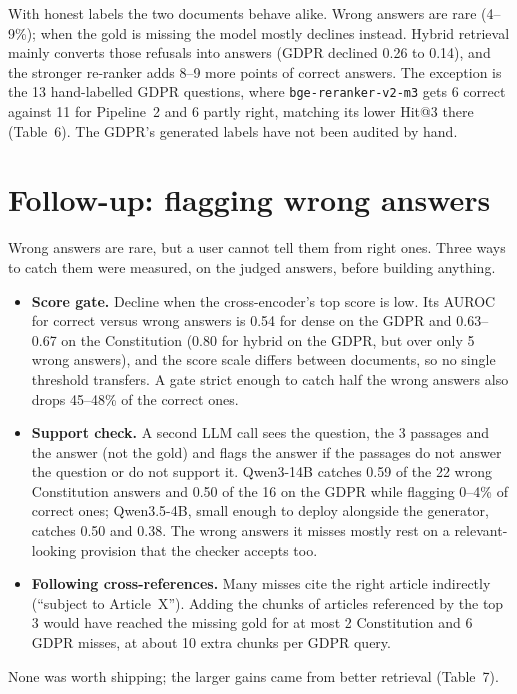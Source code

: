 \documentclass[10pt,a4paper]{article}
\begin{document}
With honest labels the two documents behave alike. Wrong answers are rare (4--9\%); when the gold is missing the
model mostly declines instead. Hybrid retrieval mainly converts those refusals into answers (GDPR declined 0.26 to
0.14), and the stronger re-ranker adds 8--9 more points of correct answers. The exception is the 13 hand-labelled
GDPR questions, where \texttt{bge-reranker-v2-m3} gets 6 correct against 11 for Pipeline~2 and 6 partly right,
matching its lower Hit@3 there (Table~6). The GDPR's generated labels have not been audited by hand.

\section{Follow-up: flagging wrong answers}

Wrong answers are rare, but a user cannot tell them from right ones. Three ways to catch them were measured, on the
judged answers, before building anything.
\begin{itemize}
  \item \textbf{Score gate.} Decline when the cross-encoder's top score is low. Its AUROC for correct versus wrong
    answers is 0.54 for dense on the GDPR and 0.63--0.67 on the Constitution (0.80 for hybrid on the GDPR, but
    over only 5 wrong answers), and the score scale differs between documents, so no single threshold transfers.
    A gate strict enough to catch half the wrong answers also drops 45--48\% of the correct ones.
  \item \textbf{Support check.} A second LLM call sees the question, the 3 passages and the answer (not the gold) and
    flags the answer if the passages do not answer the question or do not support it. Qwen3-14B catches 0.59 of the
    22 wrong Constitution answers and 0.50 of the 16 on the GDPR while flagging 0--4\% of correct ones;
    Qwen3.5-4B, small enough to deploy alongside the generator, catches 0.50 and 0.38. The wrong answers it misses
    mostly rest on a relevant-looking provision that the checker accepts too.
  \item \textbf{Following cross-references.} Many misses cite the right article indirectly (``subject to
    Article~X''). Adding the chunks of articles referenced by the top 3 would have reached the missing gold for
    at most 2 Constitution and 6 GDPR misses, at about 10 extra chunks per GDPR query.
\end{itemize}
None was worth shipping; the larger gains came from better retrieval (Table~7).
\end{document}
